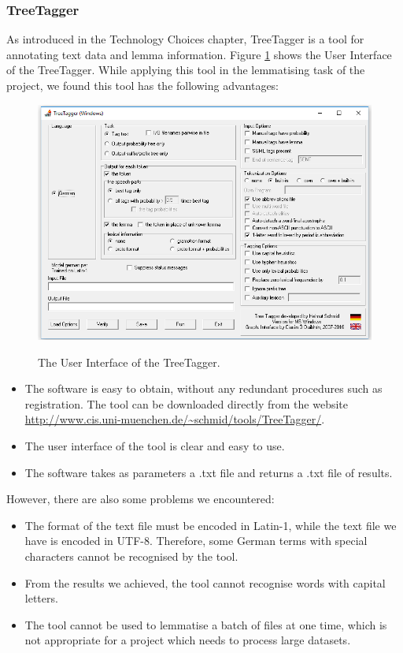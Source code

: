 \subsubsection{TreeTagger}

As introduced in the Technology Choices chapter, TreeTagger is a tool for annotating text data and lemma information. Figure \ref{fig:treeTaggerUI} shows the User Interface of the TreeTagger. While applying this tool in the lemmatising task of the project, we found this tool has the following advantages:

\begin{figure}[H]
	\centering	
	\includegraphics[scale=0.6]{Figs/TreeTaggerInterface}\\[1ex]
	\caption{The User Interface of the TreeTagger.}
	\label{fig:treeTaggerUI}
\end{figure} 

\begin{itemize}
	\item \textbf{} The software is easy to obtain, without any redundant procedures such as registration. The tool can be downloaded directly from the website \url{http://www.cis.uni-muenchen.de/~schmid/tools/TreeTagger/}.
	\item \textbf{} The user interface of the tool is clear and easy to use.
	\item \textbf{} The software takes as parameters a .txt file and returns a .txt file of results.	
\end{itemize}

However, there are also some problems we encountered:
\begin{itemize}
	\item \textbf{} The format of the text file must be encoded in Latin-1, while the text file we have is encoded in UTF-8. Therefore, some German terms with special characters cannot be recognised by the tool.
	\item \textbf{} From the results we achieved, the tool cannot recognise words with capital letters. 
	\item \textbf{} The tool cannot be used to lemmatise a batch of files at one time, which is not appropriate for a project which needs to process large datasets. 	
\end{itemize}

